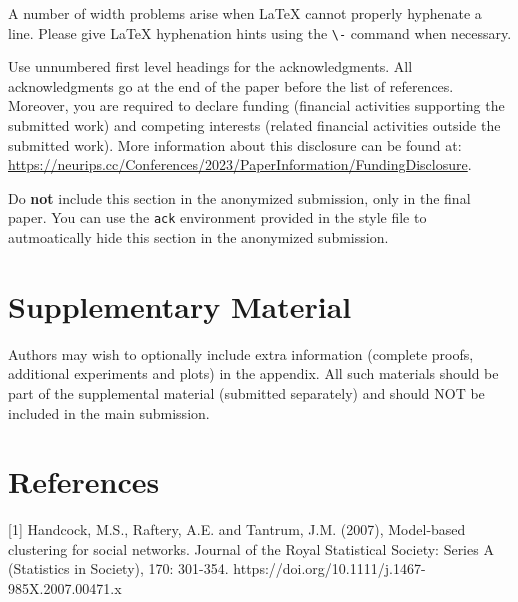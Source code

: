 \documentclass{article}
\begin{document}
A number of width problems arise when \LaTeX{} cannot properly hyphenate a
line. Please give LaTeX hyphenation hints using the \verb+\-+ command when
necessary.


\begin{ack}
Use unnumbered first level headings for the acknowledgments. All acknowledgments
go at the end of the paper before the list of references. Moreover, you are required to declare
funding (financial activities supporting the submitted work) and competing interests (related financial activities outside the submitted work).
More information about this disclosure can be found at: \url{https://neurips.cc/Conferences/2023/PaperInformation/FundingDisclosure}.


Do {\bf not} include this section in the anonymized submission, only in the final paper. You can use the \texttt{ack} environment provided in the style file to autmoatically hide this section in the anonymized submission.
\end{ack}



\section{Supplementary Material}

Authors may wish to optionally include extra information (complete proofs, additional experiments and plots) in the appendix. All such materials should be part of the supplemental material (submitted separately) and should NOT be included in the main submission.


\section*{References}

{
\small

[1] Handcock, M.S., Raftery, A.E. and Tantrum, J.M. (2007), Model-based clustering for social networks. Journal of the Royal Statistical Society: Series A (Statistics in Society), 170: 301-354. https://doi.org/10.1111/j.1467-985X.2007.00471.x






}

\end{document}
